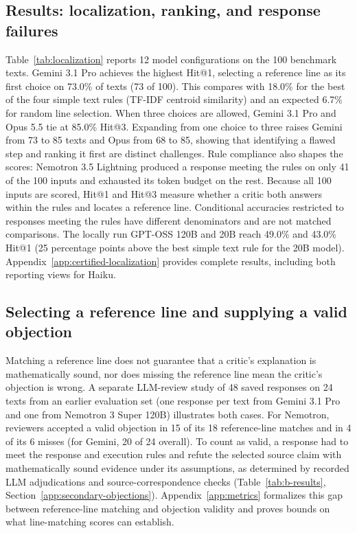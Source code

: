 \subsection{Results: localization, ranking, and response failures}
Table~\ref{tab:localization} reports 12 model configurations on the 100 benchmark texts. Gemini 3.1 Pro achieves the highest Hit@1, selecting a reference line as its first choice on 73.0\% of texts (73 of 100). This compares with 18.0\% for the best of the four simple text rules (TF-IDF centroid similarity) and an expected 6.7\% for random line selection. When three choices are allowed, Gemini 3.1 Pro and Opus 5.5 tie at 85.0\% Hit@3. Expanding from one choice to three raises Gemini from 73 to 85 texts and Opus from 68 to 85, showing that identifying a flawed step and ranking it first are distinct challenges. Rule compliance also shapes the scores: Nemotron 3.5 Lightning produced a response meeting the rules on only 41 of the 100 inputs and exhausted its token budget on the rest. Because all 100 inputs are scored, Hit@1 and Hit@3 measure whether a critic both answers within the rules and locates a reference line. Conditional accuracies restricted to responses meeting the rules have different denominators and are not matched comparisons. The locally run GPT-OSS 120B and 20B reach 49.0\% and 43.0\% Hit@1 (25 percentage points above the best simple text rule for the 20B model). Appendix~\ref{app:certified-localization} provides complete results, including both reporting views for Haiku.

\subsection{Selecting a reference line and supplying a valid objection}
Matching a reference line does not guarantee that a critic's explanation is mathematically sound, nor does missing the reference line mean the critic's objection is wrong. A separate LLM-review study of 48 saved responses on 24 texts from an earlier evaluation set (one response per text from Gemini 3.1 Pro and one from Nemotron 3 Super 120B) illustrates both cases. For Nemotron, reviewers accepted a valid objection in 15 of its 18 reference-line matches and in 4 of its 6 misses (for Gemini, 20 of 24 overall). To count as valid, a response had to meet the response and execution rules and refute the selected source claim with mathematically sound evidence under its assumptions, as determined by recorded LLM adjudications and source-correspondence checks (Table~\ref{tab:b-results}, Section~\ref{app:secondary-objections}). Appendix~\ref{app:metrics} formalizes this gap between reference-line matching and objection validity and proves bounds on what line-matching scores can establish.




